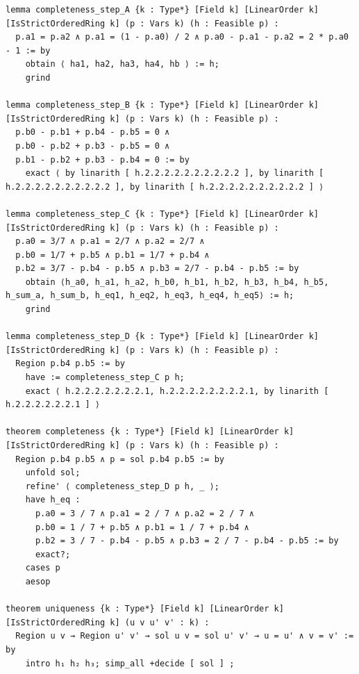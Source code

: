 \documentclass[11pt]{article}
\begin{document}
\begin{lstlisting}
lemma completeness_step_A {k : Type*} [Field k] [LinearOrder k] [IsStrictOrderedRing k] (p : Vars k) (h : Feasible p) :
  p.a1 = p.a2 ∧ p.a1 = (1 - p.a0) / 2 ∧ p.a0 - p.a1 - p.a2 = 2 * p.a0 - 1 := by
    obtain ⟨ ha1, ha2, ha3, ha4, hb ⟩ := h;
    grind

lemma completeness_step_B {k : Type*} [Field k] [LinearOrder k] [IsStrictOrderedRing k] (p : Vars k) (h : Feasible p) :
  p.b0 - p.b1 + p.b4 - p.b5 = 0 ∧
  p.b0 - p.b2 + p.b3 - p.b5 = 0 ∧
  p.b1 - p.b2 + p.b3 - p.b4 = 0 := by
    exact ⟨ by linarith [ h.2.2.2.2.2.2.2.2.2.2 ], by linarith [ h.2.2.2.2.2.2.2.2.2.2 ], by linarith [ h.2.2.2.2.2.2.2.2.2.2 ] ⟩

lemma completeness_step_C {k : Type*} [Field k] [LinearOrder k] [IsStrictOrderedRing k] (p : Vars k) (h : Feasible p) :
  p.a0 = 3/7 ∧ p.a1 = 2/7 ∧ p.a2 = 2/7 ∧
  p.b0 = 1/7 + p.b5 ∧ p.b1 = 1/7 + p.b4 ∧
  p.b2 = 3/7 - p.b4 - p.b5 ∧ p.b3 = 2/7 - p.b4 - p.b5 := by
    obtain ⟨h_a0, h_a1, h_a2, h_b0, h_b1, h_b2, h_b3, h_b4, h_b5, h_sum_a, h_sum_b, h_eq1, h_eq2, h_eq3, h_eq4, h_eq5⟩ := h;
    grind

lemma completeness_step_D {k : Type*} [Field k] [LinearOrder k] [IsStrictOrderedRing k] (p : Vars k) (h : Feasible p) :
  Region p.b4 p.b5 := by
    have := completeness_step_C p h;
    exact ⟨ h.2.2.2.2.2.2.2.1, h.2.2.2.2.2.2.2.2.1, by linarith [ h.2.2.2.2.2.2.1 ] ⟩

theorem completeness {k : Type*} [Field k] [LinearOrder k] [IsStrictOrderedRing k] (p : Vars k) (h : Feasible p) :
  Region p.b4 p.b5 ∧ p = sol p.b4 p.b5 := by
    unfold sol;
    refine' ⟨ completeness_step_D p h, _ ⟩;
    have h_eq :
      p.a0 = 3 / 7 ∧ p.a1 = 2 / 7 ∧ p.a2 = 2 / 7 ∧
      p.b0 = 1 / 7 + p.b5 ∧ p.b1 = 1 / 7 + p.b4 ∧
      p.b2 = 3 / 7 - p.b4 - p.b5 ∧ p.b3 = 2 / 7 - p.b4 - p.b5 := by
      exact?;
    cases p
    aesop

theorem uniqueness {k : Type*} [Field k] [LinearOrder k] [IsStrictOrderedRing k] (u v u' v' : k) :
  Region u v → Region u' v' → sol u v = sol u' v' → u = u' ∧ v = v' := by
    intro h₁ h₂ h₃; simp_all +decide [ sol ] ;
\end{lstlisting}
\end{document}
